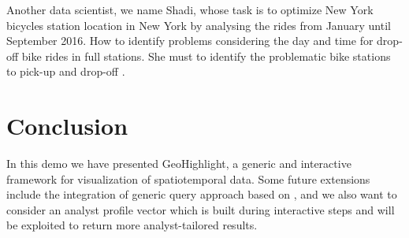\documentclass[conference]{IEEEtran}
\newcommand{\sys}{{\sc GeoHighlight}}
\begin{document}
 
 Another data scientist, we name Shadi, whose task is to optimize New York bicycles station location in New York by analysing the rides from January until September 2016. How to identify problems considering the day and time for drop-off  bike rides in full stations. She must to identify the problematic bike stations to pick-up and drop-off .
 
 \section{Conclusion}
 
 In this demo we have presented \sys, a generic and interactive
framework for visualization of spatiotemporal data. Some future extensions include the integration
of generic query approach based on \cite{VartakRMPP15}, and we also want to consider an analyst profile vector which is built during interactive steps and will be exploited to return more analyst-tailored results.








\end{document}
